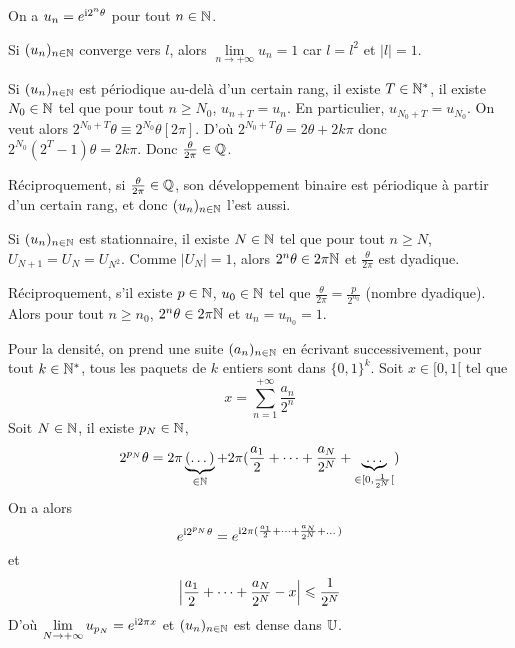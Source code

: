 \begin{solution}
	On a $u_{n}=e^{\mathrm{i} 2^{n}\theta}$ pour tout $n\in\mathbb{N}$.

	Si $(u_{n})_{n\in\mathbb{N}}$ converge vers $l$, alors $\lim\limits_{n\to+\infty}u_{n}=1$ car $l=l^{2}$ et $\vert l\vert=1$.

	Si $(u_{n})_{n\in\mathbb{N}}$ est périodique au-delà d'un certain rang, il existe $T\in\mathbb{N}^{*}$, il existe $N_{0}\in\mathbb{N}$ tel que pour tout $n\geqslant N_{0}$, $u_{n+T}=u_{n}$. En particulier, $u_{N_{0}+T}=u_{N_{0}}$. On veut alors $2^{N_{0}+T}\theta\equiv 2^{N_{0}}\theta[2\pi]$. D'où $2^{N_{0}+T}\theta=2\theta+2k\pi$ donc $2^{N_{0}}(2^{T}-1)\theta=2k\pi$. Donc $\frac{\theta}{2\pi}\in\mathbb{Q}$.

	Réciproquement, si $\frac{\theta}{2\pi}\in\mathbb{Q}$, son développement binaire est périodique à partir d'un certain rang, et donc $(u_{n})_{n\in\mathbb{N}}$ l'est aussi.

	Si $(u_{n})_{n\in\mathbb{N}}$ est stationnaire, il existe $N\in\mathbb{N}$ tel que pour tout $n\geqslant N$, $U_{N+1}=U_{N}=U_{N^{2}}$. Comme $\vert U_{N}\vert=1$, alors $2^{n}\theta\in 2\pi\mathbb{N}$ et $\frac{\theta}{2\pi}$ est dyadique. 

	Réciproquement, s'il existe $p\in\mathbb{N}$, $u_{0}\in\mathbb{N}$ tel que $\frac{\theta}{2\pi}=\frac{p}{2^{n_{0}}}$ (nombre dyadique). Alors pour tout $n\geqslant n_{0}$, $2^{n}\theta\in 2\pi\mathbb{N}$ et $u_{n}=u_{n_{0}}=1$.

	Pour la densité, on prend une suite $(a_{n})_{n\in\mathbb{N}}$ en écrivant successivement, pour tout $k\in\mathbb{N}^{*}$, tous les paquets de $k$ entiers sont dans $\{0,1\}^{k}$. Soit $x\in[0,1[$ tel que 
	$$x=\sum_{n=1}^{+\infty}\frac{a_{n}}{2^{n}}$$
	Soit $N\in\mathbb{N}$, il existe $p_{N}\in\mathbb{N}$, 
	$$2^{p_{N}}\theta=2\pi\underbrace{(\dots)}_{\in\mathbb{N}}+2\pi(\frac{a_{1}}{2}+\dots+\frac{a_{N}}{2^{N}}+\underbrace{\dots}_{\in[0,\frac{1}{2^{N}}[})$$
	On a alors 
	$$e^{\mathrm{i}2^{p_{N}}\theta}=e^{\mathrm{i}2\pi(\frac{a_{1}}{2}+\dots+\frac{a_{N}}{2^{N}}+\dots)}$$
	et 
	$$\Bigl\vert\frac{a_{1}}{2}+\dots+\frac{a_{N}}{2^{N}}-x\Bigr\vert\leqslant\frac{1}{2^{N}}$$
	D'où $\lim\limits_{N\to+\infty}u_{p_{N}}=e^{\mathrm{i}2\pi x}$ et $(u_{n})_{n\in\mathbb{N}}$ est dense dans $\mathbb{U}$.
\end{solution}

